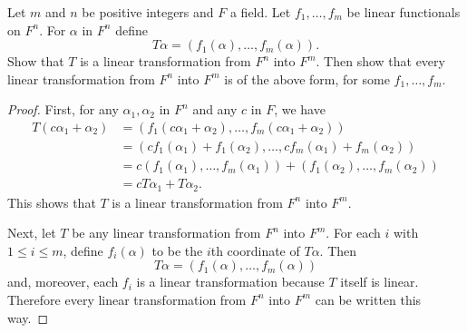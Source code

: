  Let $m$ and $n$ be positive integers and $F$ a field. Let
$f_1,\dots,f_m$ be linear functionals on $F^n$. For $\alpha$ in $F^n$
define
\begin{equation*}
  T\alpha = (f_1(\alpha), \dots, f_m(\alpha)).
\end{equation*}
Show that $T$ is a linear transformation from $F^n$ into $F^m$. Then
show that every linear transformation from $F^n$ into $F^m$ is of the
above form, for some $f_1,\dots,f_m$.
\begin{proof}
  First, for any $\alpha_1,\alpha_2$ in $F^n$ and any $c$ in $F$, we
  have
  \begin{align*}
    T(c\alpha_1 + \alpha_2)
    &= (f_1(c\alpha_1 + \alpha_2), \dots, f_m(c\alpha_1 + \alpha_2)) \\
    &= (cf_1(\alpha_1) + f_1(\alpha_2),
      \dots, cf_m(\alpha_1) + f_m(\alpha_2)) \\
    &= c(f_1(\alpha_1), \dots, f_m(\alpha_1))
      + (f_1(\alpha_2), \dots, f_m(\alpha_2)) \\
    &= cT\alpha_1 + T\alpha_2.
  \end{align*}
  This shows that $T$ is a linear transformation from $F^n$ into
  $F^m$.

  Next, let $T$ be any linear transformation from $F^n$ into
  $F^m$. For each $i$ with $1\leq i\leq m$, define $f_i(\alpha)$ to be
  the $i$th coordinate of $T\alpha$. Then
  \begin{equation*}
    T\alpha = (f_1(\alpha), \dots, f_m(\alpha))
  \end{equation*}
  and, moreover, each $f_i$ is a linear transformation because $T$
  itself is linear. Therefore every linear transformation from $F^n$
  into $F^m$ can be written this way.
\end{proof}

